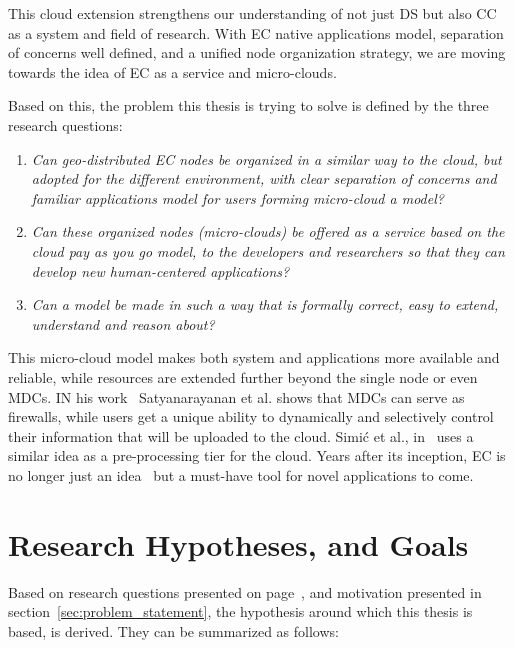 This cloud extension strengthens our understanding of not just DS but also CC as a system and field of research. With EC native applications model, separation of concerns well defined, and a unified node organization strategy, we are moving towards the idea of EC as a service and micro-clouds. 

Based on this, the problem this thesis is trying to solve is defined by the three research questions:

\begin{enumerate}[start=1,label={(\bfseries \arabic*)}]\label{questions}
	\item \textit{Can geo-distributed EC nodes be organized in a similar  way to the cloud, but adopted for the different environment, with clear separation of concerns and familiar applications model for users forming micro-cloud a model?}
	\item \textit{Can these organized nodes (micro-clouds) be offered as a service based on the cloud pay as you go model, to the developers and researchers so that they can develop new human-centered applications?}
	\item \textit{Can a model be made in such a way that is formally correct, easy to extend, understand and reason about?}
\end{enumerate}

\noindent
This micro-cloud model makes both system and applications more available and reliable, while resources are extended further beyond the single node or even MDCs. IN his work~\cite{SatyanarayananK19} Satyanarayanan et al. shows that MDCs can serve as firewalls, while users get a unique ability to dynamically and selectively control their information that will be uploaded to the cloud.  Simi\' c et al., in~\cite{inproceedingsSimic1} uses a similar idea as a pre-processing tier for the cloud. Years after its inception, EC is no longer just an idea~\cite{SatyanarayananK19} but a must-have tool for novel applications to come. 
%
%
\section{Research Hypotheses, and Goals}\label{sec:research_hyphotesis_and_golas}
%
Based on research questions presented on page~\pageref{questions}, and motivation presented in section~\ref{sec:problem_statement}, the hypothesis around which this thesis is based, is derived. They can be summarized as follows:

